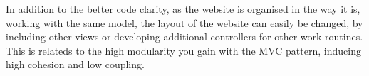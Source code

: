 In addition to the better code clarity, as the website is organised in the way it is, working with the same model, the layout of the website can easily be changed, by including other views or developing additional controllers for other work routines.
This is relateds to the high modularity you gain with the MVC pattern, inducing high cohesion and low coupling.